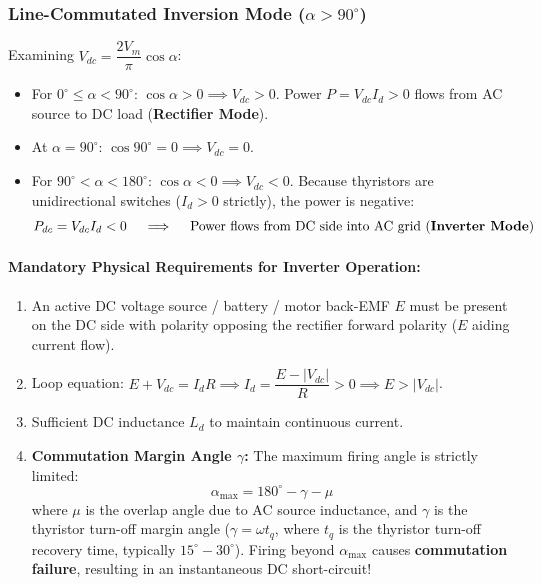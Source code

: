\subsubsection{Line-Commutated Inversion Mode ($\alpha > 90^\circ$)}
Examining $V_{dc} = \dfrac{2 V_m}{\pi}\cos\alpha$:
\begin{itemize}
  \item For $0^\circ \le \alpha < 90^\circ$: $\cos\alpha > 0 \implies V_{dc} > 0$. Power $P = V_{dc} I_d > 0$ flows from AC source to DC load (\textbf{Rectifier Mode}).
  \item At $\alpha = 90^\circ$: $\cos 90^\circ = 0 \implies V_{dc} = 0$.
  \item For $90^\circ < \alpha < 180^\circ$: $\cos\alpha < 0 \implies V_{dc} < 0$. Because thyristors are unidirectional switches ($I_d > 0$ strictly), the power is negative:
  \begin{equation}
  P_{dc} = V_{dc} I_d < 0 \quad \implies \quad \text{Power flows from DC side into AC grid (\textbf{Inverter Mode})}
  \end{equation}
\end{itemize}
\paragraph{Mandatory Physical Requirements for Inverter Operation:}
\begin{enumerate}
  \item An active DC voltage source / battery / motor back-EMF $E$ must be present on the DC side with polarity opposing the rectifier forward polarity ($E$ aiding current flow).
  \item Loop equation: $E + V_{dc} = I_d R \implies I_d = \dfrac{E - |V_{dc}|}{R} > 0 \implies E > |V_{dc}|$.
  \item Sufficient DC inductance $L_d$ to maintain continuous current.
  \item \textbf{Commutation Margin Angle $\gamma$:} The maximum firing angle is strictly limited:
  \begin{equation}
  \alpha_{\max} = 180^\circ - \gamma - \mu
  \end{equation}
  where $\mu$ is the overlap angle due to AC source inductance, and $\gamma$ is the thyristor turn-off margin angle ($\gamma = \omega t_q$, where $t_q$ is the thyristor turn-off recovery time, typically $15^\circ - 30^\circ$). Firing beyond $\alpha_{\max}$ causes \textbf{commutation failure}, resulting in an instantaneous DC short-circuit!
\end{enumerate}


